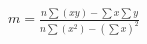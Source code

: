 \begin{gather}
m = \frac{n \sum (xy) - \sum x \sum y}{n \sum (x^2) - ( \sum x)^2}
\label{formula_linear_regression}
\end{gather}

